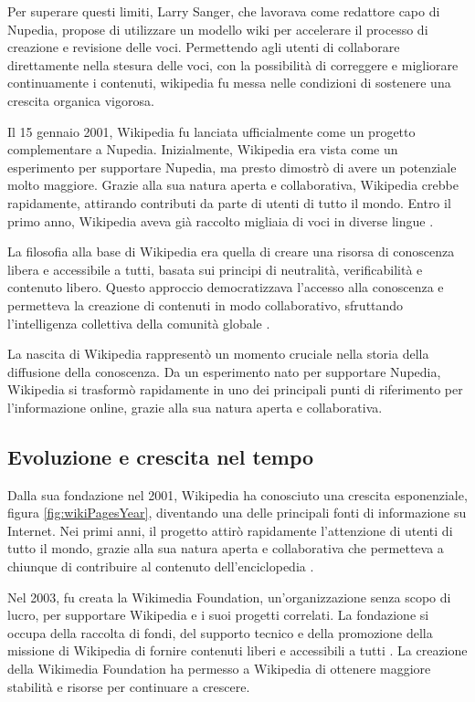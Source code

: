 \documentclass[12pt,a4paper]{report}
\begin{document}
Per superare questi limiti, Larry Sanger, che lavorava come redattore capo di Nupedia, propose di utilizzare un modello wiki per accelerare il processo di creazione e revisione delle voci. Permettendo agli utenti di collaborare direttamente nella stesura delle voci, con la possibilità di correggere e migliorare continuamente i contenuti, wikipedia fu messa nelle condizioni di sostenere una crescita organica vigorosa\cite{reagle2010good}.

Il 15 gennaio 2001, Wikipedia fu lanciata ufficialmente come un progetto complementare a Nupedia. Inizialmente, Wikipedia era vista come un esperimento per supportare Nupedia, ma presto dimostrò di avere un potenziale molto maggiore. Grazie alla sua natura aperta e collaborativa, Wikipedia crebbe rapidamente, attirando contributi da parte di utenti di tutto il mondo. Entro il primo anno, Wikipedia aveva già raccolto migliaia di voci in diverse lingue \cite{jemielniak2014wikipedia}.

La filosofia alla base di Wikipedia era quella di creare una risorsa di conoscenza libera e accessibile a tutti, basata sui principi di neutralità, verificabilità e contenuto libero. Questo approccio democratizzava l'accesso alla conoscenza e permetteva la creazione di contenuti in modo collaborativo, sfruttando l'intelligenza collettiva della comunità globale \cite{denning2005wikipedia}.

La nascita di Wikipedia rappresentò un momento cruciale nella storia della diffusione della conoscenza. Da un esperimento nato per supportare Nupedia, Wikipedia si trasformò rapidamente in uno dei principali punti di riferimento per l'informazione online, grazie alla sua natura aperta e collaborativa.

\subsection{Evoluzione e crescita nel tempo}

Dalla sua fondazione nel 2001, Wikipedia ha conosciuto una crescita esponenziale, figura \ref{fig:wikiPagesYear}, diventando una delle principali fonti di informazione su Internet. Nei primi anni, il progetto attirò rapidamente l'attenzione di utenti di tutto il mondo, grazie alla sua natura aperta e collaborativa che permetteva a chiunque di contribuire al contenuto dell'enciclopedia \cite{lih2009wikipedia}.

Nel 2003, fu creata la Wikimedia Foundation, un'organizzazione senza scopo di lucro, per supportare Wikipedia e i suoi progetti correlati. La fondazione si occupa della raccolta di fondi, del supporto tecnico e della promozione della missione di Wikipedia di fornire contenuti liberi e accessibili a tutti \cite{reagle2010good}. La creazione della Wikimedia Foundation ha permesso a Wikipedia di ottenere maggiore stabilità e risorse per continuare a crescere.
\end{document}
